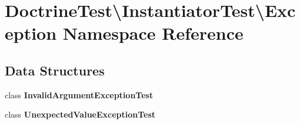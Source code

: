 \section{Doctrine\+Test\textbackslash{}Instantiator\+Test\textbackslash{}Exception Namespace Reference}
\label{namespace_doctrine_test_1_1_instantiator_test_1_1_exception}
\subsection*{Data Structures}
\begin{DoxyCompactItemize}
\item 
class {\bf Invalid\+Argument\+Exception\+Test}
\item 
class {\bf Unexpected\+Value\+Exception\+Test}
\end{DoxyCompactItemize}
